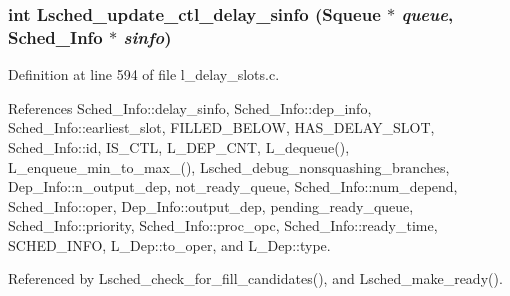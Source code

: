 \subsubsection{\setlength{\rightskip}{0pt plus 5cm}int Lsched\_\-update\_\-ctl\_\-delay\_\-sinfo (\bf{Squeue} $\ast$ {\em queue}, \bf{Sched\_\-Info} $\ast$ {\em sinfo})}\label{l__delay__slots_8c_157c81f39e21bd9b32433e03030430ce}




Definition at line 594 of file l\_\-delay\_\-slots.c.

References Sched\_\-Info::delay\_\-sinfo, Sched\_\-Info::dep\_\-info, Sched\_\-Info::earliest\_\-slot, FILLED\_\-BELOW, HAS\_\-DELAY\_\-SLOT, Sched\_\-Info::id, IS\_\-CTL, L\_\-DEP\_\-CNT, L\_\-dequeue(), L\_\-enqueue\_\-min\_\-to\_\-max\_(), Lsched\_\-debug\_\-nonsquashing\_\-branches, Dep\_\-Info::n\_\-output\_\-dep, not\_\-ready\_\-queue, Sched\_\-Info::num\_\-depend, Sched\_\-Info::oper, Dep\_\-Info::output\_\-dep, pending\_\-ready\_\-queue, Sched\_\-Info::priority, Sched\_\-Info::proc\_\-opc, Sched\_\-Info::ready\_\-time, SCHED\_\-INFO, L\_\-Dep::to\_\-oper, and L\_\-Dep::type.

Referenced by Lsched\_\-check\_\-for\_\-fill\_\-candidates(), and Lsched\_\-make\_\-ready().